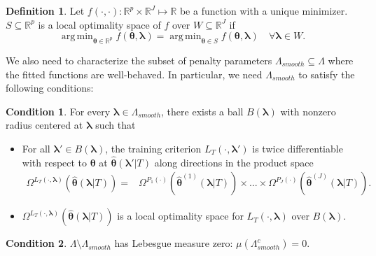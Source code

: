 \documentclass[12pt]{article} %
\theoremstyle{definition}
\newtheorem{definition}{Definition}
\newtheorem{condition}{Condition}
\DeclareMathOperator*{\argmin}{arg\,min}
\begin{document}
\begin{definition}
	Let $f(\cdot, \cdot): \mathbb{R}^p \times \mathbb{R}^J \mapsto \mathbb{R}$ be a function with a unique minimizer.
	$S \subseteq \mathbb{R}^p$ is a local optimality space of $f$ over $W \subseteq \mathbb{R}^J$ if
	\begin{equation}
	\argmin_{\boldsymbol{\theta} \in \mathbb{R}^p} f(\boldsymbol{\theta}, \boldsymbol \lambda) =
	\argmin_{\boldsymbol{\theta} \in S} f(\boldsymbol{\theta}, \boldsymbol \lambda) \quad \forall \boldsymbol \lambda \in W.
	\end{equation}
\end{definition}
We also need to characterize the subset of penalty parameters $\Lambda_{smooth} \subseteq \Lambda$ where the fitted functions are well-behaved.
In particular, we need $\Lambda_{smooth}$ to satisfy the following conditions:
\begin{condition}
	\label{condn:nonsmooth1}
	For every $\boldsymbol{\lambda} \in \Lambda_{smooth}$, there exists a ball $B(\boldsymbol{\lambda})$ with nonzero radius centered at $\boldsymbol{\lambda}$ such that
	\begin{itemize}
		\item For all $\boldsymbol{\lambda}'\in B(\boldsymbol{\lambda})$, the training criterion $L_{T}(\cdot, \boldsymbol{\lambda}')$ is twice differentiable with respect to $\boldsymbol{\theta}$ at $\hat{\boldsymbol{\theta}}(\boldsymbol{\lambda}'|T)$
		along directions in the product space
		\begin{align}
		\Omega^{L_T(\cdot, \boldsymbol{\lambda})} \left (\hat{\boldsymbol \theta}\left(\boldsymbol{\lambda}|T \right) \right) =
		& \Omega^{P_1(\cdot)}
			\left(\hat{\boldsymbol{\theta}}^{(1)}(\boldsymbol{\lambda} | T)\right)
		\times
		...
		\times
		\Omega^{P_J(\cdot)}
		\left(\hat{\boldsymbol{\theta}}^{(J)}(\boldsymbol{\lambda} | T)\right)
		.
		\end{align}
		\item $\Omega^{L_T(\cdot, \boldsymbol{\lambda})} \left (\hat{\boldsymbol \theta}\left(\boldsymbol{\lambda}|T \right) \right)$ is a local optimality space for $L_T\left(\cdot,\boldsymbol{\lambda}\right)$ over $B(\boldsymbol{\lambda})$.
	\end{itemize}
\end{condition}
\begin{condition}
	\label{condn:nonsmooth2}
	$\Lambda \setminus \Lambda_{smooth}$ has Lebesgue measure zero: $\mu(\Lambda_{smooth}^c) = 0$.
\end{condition}
\end{document}
